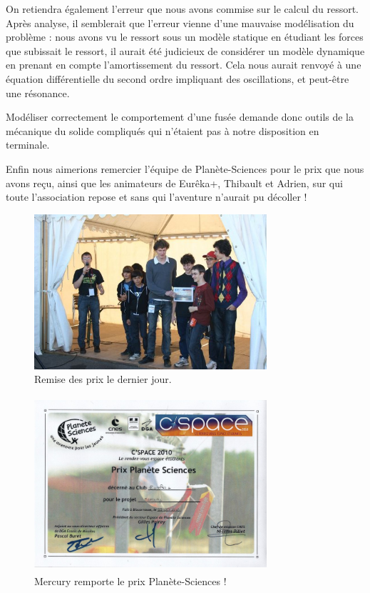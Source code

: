 \documentclass[a4paper,12pt]{scrartcl}
\begin{document}
	  On retiendra également l'erreur que nous avons commise sur le calcul du ressort. Après analyse, il semblerait que l'erreur vienne d'une mauvaise modélisation du problème : 
	  nous avons vu le ressort sous un modèle statique en étudiant les forces que subissait le ressort, il aurait été judicieux de considérer un modèle dynamique en prenant en compte l'amortissement du ressort.
	  Cela nous aurait renvoyé à une équation différentielle du second ordre impliquant des oscillations, et peut-être une résonance.

	  Modéliser correctement le comportement d'une fusée demande donc outils de la mécanique du solide compliqués qui n'étaient pas à notre disposition en terminale.
	  
	  Enfin nous aimerions remercier l'équipe de Planète-Sciences pour le prix que nous avons reçu, ainsi que les animateurs de Eurêka+, Thibault et Adrien, sur qui toute l'association repose et sans qui l'aventure n'aurait pu décoller !

	  
	      \begin{figure}[H]
		    \begin{center}
		      \caption{Remise des prix le dernier jour.}
		      \includegraphics[height=217px, width=326px]{Photos_Mercury/remise_des_prix.jpg}
		    \end{center}
	      \end{figure}
	      \begin{figure}[H]
		    \begin{center}
		      \caption{Mercury remporte le prix Planète-Sciences !}
		      \includegraphics[height=244px, width=326px]{Photos_Mercury/Mercury_Prix_PS_2010.jpg}
		    \end{center}
	      \end{figure}
\end{document}
